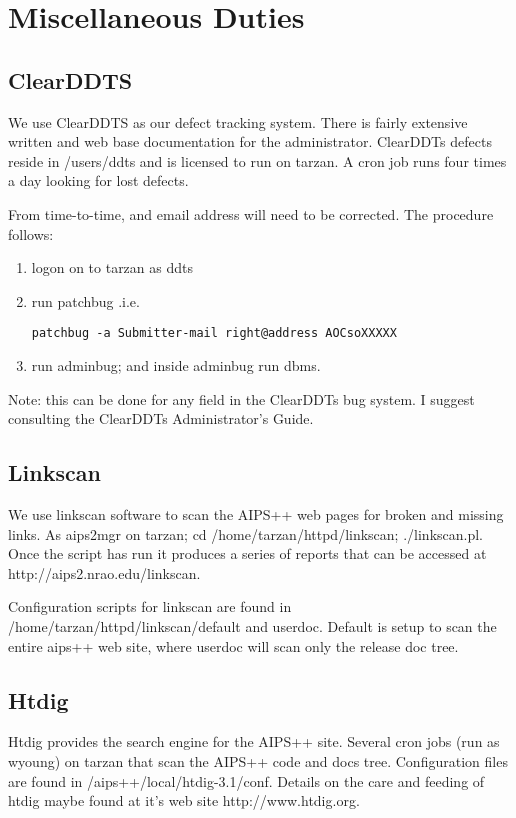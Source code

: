\chapter{Miscellaneous Duties}
\section{ClearDDTS}
We use ClearDDTS as our defect tracking system.  There is fairly extensive
written and web base documentation for the administrator.  ClearDDTs defects
reside in /users/ddts and is licensed to run on tarzan. A cron job runs four
times a day looking for lost defects.

From time-to-time, and email address will need to be corrected. The procedure follows:
\begin{enumerate}
\item logon on to tarzan as ddts
\item run patchbug .i.e.
\begin{verbatim}
patchbug -a Submitter-mail right@address AOCsoXXXXX
\end{verbatim}
\item run adminbug; and inside adminbug run dbms.
\end{enumerate}
Note: this can be done for any field in the ClearDDTs bug system.  I suggest  
consulting the ClearDDTs Administrator's Guide.
\section{Linkscan}
We use linkscan software to scan the AIPS++ web pages for broken and missing
links.  As aips2mgr on tarzan; cd /home/tarzan/httpd/linkscan; ./linkscan.pl.
Once the script has run it produces a series of reports that can be accessed
at http://aips2.nrao.edu/linkscan.

Configuration scripts for linkscan are found in
/home/tarzan/httpd/linkscan/default and userdoc.  Default is setup to scan the
entire aips++ web site, where userdoc will scan only the release doc tree.
\section{Htdig}
Htdig provides the search engine for the AIPS++ site.  Several cron jobs 
(run as wyoung) 
on tarzan that scan the AIPS++ code and docs tree.  Configuration files are found
in /aips++/local/htdig-3.1/conf.  Details on the care and feeding of htdig maybe
found at it's web site http://www.htdig.org.

